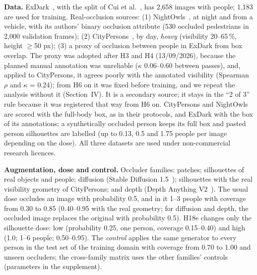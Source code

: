 \documentclass[conference]{IEEEtran}
\begin{document}
\textbf{Data.} ExDark~\cite{Loh2019}, with the split of Cui et al.~\cite{Cui2021}, has 2,658 images with people; 1,183 are used for training. Real-occlusion sources: (1) NightOwls~\cite{Neumann2019}, at night and from a vehicle, with its authors' binary occlusion attribute (530 occluded pedestrians in 2,000 validation frames); (2) CityPersons~\cite{Zhang2017}, by day, \emph{heavy} (visibility 20--65\,\%, height $\geq$50 px); (3) a proxy of occlusion between people in ExDark from box overlap. The proxy was adopted after H3 and H4 (13/09/2026), because the planned manual annotation was unreliable ($\kappa$ 0.06--0.60 between passes), and, applied to CityPersons, it agrees poorly with the annotated visibility (Spearman $\rho$ and $\kappa$ = 0.24); from H6 on it was fixed before training, and we repeat the analysis without it (Section~IV). It is a secondary source; it stays in the ``2 of 3'' rule because it was registered that way from H6 on. CityPersons and NightOwls are scored with the full-body box, as in their protocols, and ExDark with the box of its annotations; a synthetically occluded person keeps its full box and pasted person silhouettes are labelled (up to 0.13, 0.5 and 1.75 people per image depending on the dose). All three datasets are used under non-commercial research licences.

\textbf{Augmentation, dose and control.} Occluder families: patches; silhouettes of real objects and people; diffusion (Stable Diffusion 1.5~\cite{Rombach2022ldm}); silhouettes with the real visibility geometry of CityPersons; and depth (Depth Anything V2~\cite{Yang2024depthv2}). The usual dose occludes an image with probability 0.5, and in it 1--3 people with coverage from 0.30 to 0.85 (0.40--0.95 with the real geometry; for diffusion and depth, the occluded image replaces the original with probability 0.5). H18e changes only the silhouette dose: low (probability 0.25, one person, coverage 0.15--0.40) and high (1.0; 1--6 people; 0.50--0.95). The \emph{control} applies the same generator to every person in the test set of the training domain with coverage from 0.70 to 1.00 and unseen occluders; the cross-family matrix uses the other families' controls (parameters in the supplement).
\end{document}
